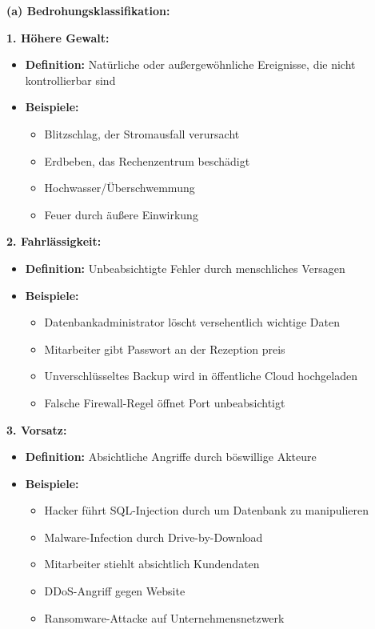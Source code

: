 \documentclass[12pt,a4paper]{article}
\begin{document}
\begin{tcolorbox}[colback=solutionbg, colframe=black!30]

\textbf{(a) Bedrohungsklassifikation:}

\textbf{1. Höhere Gewalt:} \checkmark
\begin{itemize}
    \item \textbf{Definition:} Natürliche oder außergewöhnliche Ereignisse, die nicht kontrollierbar sind
    \item \textbf{Beispiele:}
    \begin{itemize}
        \item Blitzschlag, der Stromausfall verursacht
        \item Erdbeben, das Rechenzentrum beschädigt
        \item Hochwasser/Überschwemmung
        \item Feuer durch äußere Einwirkung
    \end{itemize}
\end{itemize}

\textbf{2. Fahrlässigkeit:} \checkmark
\begin{itemize}
    \item \textbf{Definition:} Unbeabsichtigte Fehler durch menschliches Versagen
    \item \textbf{Beispiele:}
    \begin{itemize}
        \item Datenbankadministrator löscht versehentlich wichtige Daten
        \item Mitarbeiter gibt Passwort an der Rezeption preis
        \item Unverschlüsseltes Backup wird in öffentliche Cloud hochgeladen
        \item Falsche Firewall-Regel öffnet Port unbeabsichtigt
    \end{itemize}
\end{itemize}

\textbf{3. Vorsatz:} \checkmark
\begin{itemize}
    \item \textbf{Definition:} Absichtliche Angriffe durch böswillige Akteure
    \item \textbf{Beispiele:}
    \begin{itemize}
        \item Hacker führt SQL-Injection durch um Datenbank zu manipulieren
        \item Malware-Infection durch Drive-by-Download
        \item Mitarbeiter stiehlt absichtlich Kundendaten
        \item DDoS-Angriff gegen Website
        \item Ransomware-Attacke auf Unternehmensnetzwerk
    \end{itemize}
\end{itemize}

\end{tcolorbox}
\end{document}
